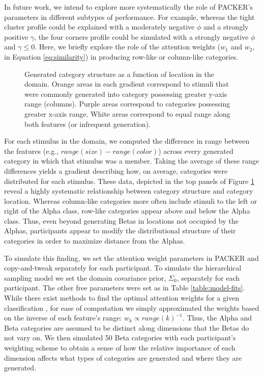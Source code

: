 \documentclass[10pt,letterpaper]{article}
\newcommand\inputpgf[2]{{
\let\pgfimageWithoutPath\pgfimage
\renewcommand{\pgfimage}[2][]{\pgfimageWithoutPath[##1]{#1/##2}}

}}
\begin{document}
In future work, we intend to explore more systematically the role of PACKER's parameters in different subtypes of performance. For example, whereas the tight cluster profile could be explained with a moderately negative $\phi$ and a strongly positive $\gamma$, the four corners profile could be simulated with a strongly negative $\phi$ and $\gamma\leq0$. Here, we briefly explore the role of the attention weights ($w_1$ and $w_2$, in Equation \ref{eq:similarity}) in producing row-like or column-like categories.

\begin{figure}[ht!]
    \begin{center}
    \inputpgf{figs/}{range-diff-gradient.pgf}
    \caption{Generated category structure as a function of location in the domain. Orange areas in each gradient correspond to stimuli that were commonly generated into category possessing greater y-axis range (columns). Purple areas correspond to categories possessing greater x-axis range. White areas correspond to equal range along both features (or infrequent generation).}
    \label{fig:range-diff-gradient}
    \end{center}
\end{figure}

For each stimulus in the domain, we computed the difference in range between the features (e.g., $range(size) - range(color)$) across every generated category in which that stimulus was a member. Taking the average of these range differences yields a gradient describing how, on average, categories were distributed for each stimulus. These data, depicted in the top panels of Figure \ref{fig:range-diff-gradient} reveal a highly systematic relationship between category structure and category location. Whereas column-like categories more often include stimuli to the left or right of the Alpha class, row-like categories appear above and below the Alpha class.  Thus, even beyond generating Betas in locations not occupied by the Alphas, participants appear to modify the distributional structure of their categories in order to maximize distance from the Alphas.

To simulate this finding, we set the attention weight parameters in PACKER and copy-and-tweak separately for each participant. To simulate the hierarchical sampling model we set the domain covariance prior, $\Sigma_0$, separately for each participant. The other free parameters were set as in Table \ref{table:model-fits}. While there exist methods to find the optimal attention weights for a given classification \citep[see][]{vanpaemel2012using}, for ease of computation we simply approximated the weights based on the inverse of each feature's range: $w_k \propto range(k)^{-1}$. Thus, the Alpha and Beta categories are assumed to be distinct along dimensions that the Betas do not vary on. We then simulated 50 Beta categories with each participant's weighting scheme to obtain a sense of how the relative importance of each dimension affects what types of categories are generated and where they are generated. 
\end{document}
